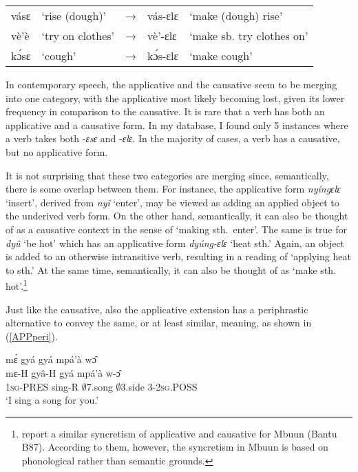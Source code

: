 \begin{exe} \ex \label{AppCau}
\begin{tabular}{lllll}
vásɛ & `rise (dough)' & → & vás-ɛlɛ & `make (dough) rise' \\
vè'è & `try on clothes' & → & vè'-ɛlɛ & `make sb. try clothes on' \\
kɔ́sɛ & `cough' & → & kɔ́s-ɛlɛ & `make cough' \\
\end{tabular}
\end{exe} 

In contemporary speech, the applicative and the causative seem to be merging into one category, with the applicative most likely becoming lost, given its lower frequency in comparison to the causative.  It is rare that a verb has both an applicative and a causative form. In my database, I  found only 5 instances where a verb takes both -{\itshape ɛsɛ} and -{\itshape ɛlɛ}. In the majority of cases, a verb has a causative, but no applicative form.

It is not surprising that these two categories are merging since, semantically, there is some overlap between them. For instance, the applicative form {\itshape nyíngɛlɛ} `insert', derived from {\itshape nyî} `enter',  may be viewed as adding an applied object to the underived verb form. On the other hand, semantically, it can also be thought of as a causative context in the sense of `making sth.\ enter'. The same is true for {\itshape dyû} `be hot' which has an applicative form {\itshape dyúng-ɛlɛ} `heat sth.' Again, an object is added to an otherwise intransitive verb, resulting in a reading of `applying heat to sth.' At the same time, semantically, it can also be thought of as `make sth. hot'.\footnote{\citet{bostoen2011} report a similar syncretism of applicative and causative for Mbuun (Bantu B87). According to them, however, the syncretism in Mbuun is based on phonological rather than semantic grounds.}

Just like the causative, also the applicative extension has a periphrastic alternative to convey the same, or at least similar, meaning, as shown in (\ref{APPperi}).

\begin{exe} 
\ex\label{APPperi}
  \glll     mɛ́ gyá gyá mpá'à wɔ̂ \\
	mɛ-H gyâ-H gyá mpá'à w-ɔ̂ \\
              1\textsc{sg}-PRES sing-R $\emptyset$7.song $\emptyset$3.side 3-2\textsc{sg}.POSS   \\
    \trans `I sing a song for you.'
\end{exe}



